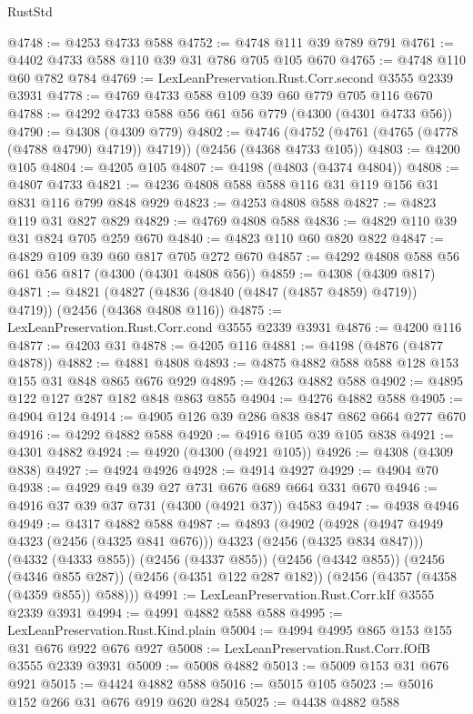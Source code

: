 \begin{lexlean}{RustStd}
\begin{coremodule}
@4748 := @4253 @4733 @588
@4752 := @4748 @111 @39 @789 @791
@4761 := @4402 @4733 @588 @110 @39 @31 @786 @705 @105 @670
@4765 := @4748 @110 @60 @782 @784
@4769 := LexLeanPreservation.Rust.Corr.second @3555 @2339 @3931
@4778 := @4769 @4733 @588 @109 @39 @60 @779 @705 @116 @670
@4788 := @4292 @4733 @588 @56 @61 @56 @779 (@4300 (@4301 @4733 @56))
@4790 := @4308 (@4309 @779)
@4802 := @4746 (@4752 (@4761 (@4765 (@4778 (@4788 @4790) @4719)) @4719)) (@2456 (@4368 @4733 @105))
@4803 := @4200 @105
@4804 := @4205 @105
@4807 := @4198 (@4803 (@4374 @4804))
@4808 := @4807 @4733
@4821 := @4236 @4808 @588 @588 @116 @31 @119 @156 @31 @831 @116 @799 @848 @929
@4823 := @4253 @4808 @588
@4827 := @4823 @119 @31 @827 @829
@4829 := @4769 @4808 @588
@4836 := @4829 @110 @39 @31 @824 @705 @259 @670
@4840 := @4823 @110 @60 @820 @822
@4847 := @4829 @109 @39 @60 @817 @705 @272 @670
@4857 := @4292 @4808 @588 @56 @61 @56 @817 (@4300 (@4301 @4808 @56))
@4859 := @4308 (@4309 @817)
@4871 := @4821 (@4827 (@4836 (@4840 (@4847 (@4857 @4859) @4719)) @4719)) (@2456 (@4368 @4808 @116))
@4875 := LexLeanPreservation.Rust.Corr.cond @3555 @2339 @3931
@4876 := @4200 @116
@4877 := @4203 @31
@4878 := @4205 @116
@4881 := @4198 (@4876 (@4877 @4878))
@4882 := @4881 @4808
@4893 := @4875 @4882 @588 @588 @128 @153 @155 @31 @848 @865 @676 @929
@4895 := @4263 @4882 @588
@4902 := @4895 @122 @127 @287 @182 @848 @863 @855
@4904 := @4276 @4882 @588
@4905 := @4904 @124
@4914 := @4905 @126 @39 @286 @838 @847 @862 @664 @277 @670
@4916 := @4292 @4882 @588
@4920 := @4916 @105 @39 @105 @838
@4921 := @4301 @4882
@4924 := @4920 (@4300 (@4921 @105))
@4926 := @4308 (@4309 @838)
@4927 := @4924 @4926
@4928 := @4914 @4927
@4929 := @4904 @70
@4938 := @4929 @49 @39 @27 @731 @676 @689 @664 @331 @670
@4946 := @4916 @37 @39 @37 @731 (@4300 (@4921 @37)) @4583
@4947 := @4938 @4946
@4949 := @4317 @4882 @588
@4987 := @4893
    (@4902
      (@4928 (@4947 @4949 @4323 (@2456 (@4325 @841 @676))) @4323 (@2456 (@4325 @834 @847)))
      (@4332 (@4333 @855))
      (@2456 (@4337 @855))
      (@2456 (@4342 @855))
      (@2456 (@4346 @855 @287))
      (@2456 (@4351 @122 @287 @182))
      (@2456 (@4357 (@4358 (@4359 @855)) @588)))
@4991 := LexLeanPreservation.Rust.Corr.kIf @3555 @2339 @3931
@4994 := @4991 @4882 @588 @588
@4995 := LexLeanPreservation.Rust.Kind.plain
@5004 := @4994 @4995 @865 @153 @155 @31 @676 @922 @676 @927
@5008 := LexLeanPreservation.Rust.Corr.fOfB @3555 @2339 @3931
@5009 := @5008 @4882
@5013 := @5009 @153 @31 @676 @921
@5015 := @4424 @4882 @588
@5016 := @5015 @105
@5023 := @5016 @152 @266 @31 @676 @919 @620 @284
@5025 := @4438 @4882 @588

\end{coremodule}
\end{lexlean}
